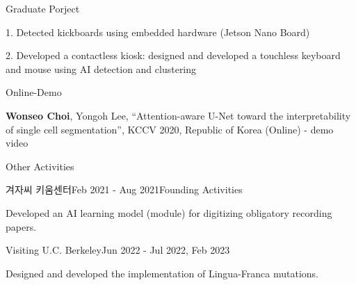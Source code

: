 \documentclass[
	11pt, %
]{resume} %
\begin{document}
\begin{rSection}{Graduate Porject}
	
	1. Detected kickboards using embedded hardware (Jetson Nano Board)

	2. Developed a contactless kiosk: designed and developed a touchless keyboard and mouse using AI detection and clustering
	\\

\end{rSection}

\begin{rSection}{Online-Demo}
	
	\textbf{Wonseo Choi}, Yongoh Lee, “Attention-aware U-Net toward the interpretability of single cell segmentation”, KCCV 2020, Republic of Korea (Online) - demo video

\end{rSection}

	



\begin{rSection}{Other Activities}

	\begin{rSubsection}{겨자씨 키움센터}{Feb 2021 - Aug 2021}{Founding Activities}{}
		\item Developed an AI learning model (module) for digitizing obligatory recording papers.
	\end{rSubsection}

	\begin{rSubsection}{Visiting U.C. Berkeley}{Jun 2022 - Jul 2022, Feb 2023}{}{}
		\item Designed and developed the implementation of Lingua-Franca mutations.
	\end{rSubsection}

\end{rSection}
\end{document}
